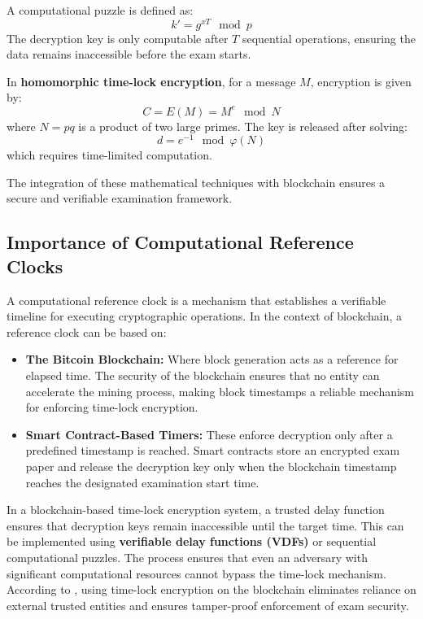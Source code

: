 \documentclass[12pt,a4paper]{article}
\begin{document}
A computational puzzle is defined as:
\begin{equation}
    k' = g^{xT} \mod p
\end{equation}
The decryption key is only computable after $T$ sequential operations, ensuring the data remains inaccessible before the exam starts.

In \textbf{homomorphic time-lock encryption}, for a message $M$, encryption is given by:
\begin{equation}
    C = E(M) = M^e \mod N
\end{equation}
where $N = pq$ is a product of two large primes. The key is released after solving:
\begin{equation}
    d = e^{-1} \mod \varphi(N)
\end{equation}
which requires time-limited computation.

The integration of these mathematical techniques with blockchain ensures a secure and verifiable examination framework.

\subsection{Importance of Computational Reference Clocks}
A computational reference clock is a mechanism that establishes a verifiable timeline for executing cryptographic operations. In the context of blockchain, a reference clock can be based on:
\begin{itemize}
    \item \textbf{The Bitcoin Blockchain:} Where block generation acts as a reference for elapsed time. The security of the blockchain ensures that no entity can accelerate the mining process, making block timestamps a reliable mechanism for enforcing time-lock encryption.
    \item \textbf{Smart Contract-Based Timers:} These enforce decryption only after a predefined timestamp is reached. Smart contracts store an encrypted exam paper and release the decryption key only when the blockchain timestamp reaches the designated examination start time.
\end{itemize}

In a blockchain-based time-lock encryption system, a trusted delay function ensures that decryption keys remain inaccessible until the target time. This can be implemented using \textbf{verifiable delay functions (VDFs)} or sequential computational puzzles. The process ensures that even an adversary with significant computational resources cannot bypass the time-lock mechanism. According to \cite{liu2018build} \cite{tle}, using time-lock encryption on the blockchain eliminates reliance on external trusted entities and ensures tamper-proof enforcement of exam security.
\end{document}
